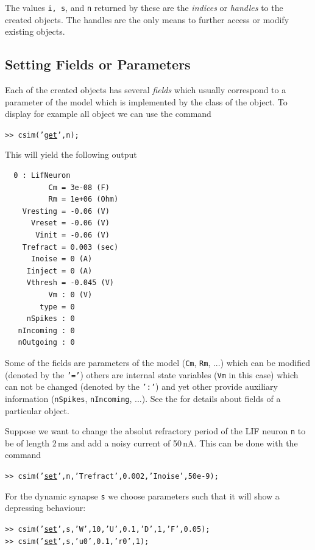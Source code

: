 The values \texttt{i, s}, and \texttt{n} returned by these
 are the \emph{indices} or
\emph{handles} to the created objects. The handles are the only means
to further access or modify existing objects.

\subsection{Setting Fields or Parameters}

Each of the created objects has several \emph{fields} which usually
correspond to a parameter of the model which is implemented by the
class of the object. To display for example all
 object we
can use the command
%
\begin{tabbing}
\quad\tt>> csim('\hyperlink{cmd:get}{get}',n);
\end{tabbing}
%
This will yield the following output
%
\begin{verbatim}
  0 : LifNeuron
          Cm = 3e-08 (F)
          Rm = 1e+06 (Ohm)
    Vresting = -0.06 (V)
      Vreset = -0.06 (V)
       Vinit = -0.06 (V)
    Trefract = 0.003 (sec)
      Inoise = 0 (A)
     Iinject = 0 (A)
     Vthresh = -0.045 (V)
          Vm : 0 (V)
        type = 0
     nSpikes : 0
   nIncoming : 0
   nOutgoing : 0
\end{verbatim}
%
Some of the fields are parameters of the model (\texttt{Cm},
\texttt{Rm}, ...) which can be modified (denoted by the \texttt{'='})
others are internal state variables (\texttt{Vm} in this case) which
can not be changed (denoted by the \texttt{':'}) and yet other provide
auxiliary information (\texttt{nSpikes}, \texttt{nIncoming}, ...). See
the  for details about fields
of a particular object.

Suppose we want to change the absolut refractory period of the LIF
neuron \texttt{n} to be of length 2\,ms and add a noisy current of
50\,nA. This can be done with the command
%
\begin{tabbing}
\quad\tt>> csim('\hyperlink{cmd:set}{set}',n,'Trefract',0.002,'Inoise',50e-9);
\end{tabbing}
%
For the dynamic synapse \texttt{s} we choose parameters such that it
will show a depressing behaviour:
%
\begin{tabbing}
\quad\tt>> csim('\hyperlink{cmd:set}{set}',s,'W',10,'U',0.1,'D',1,'F',0.05); \\
\quad\tt>> csim('\hyperlink{cmd:set}{set}',s,'u0',0.1,'r0',1);
\end{tabbing}

